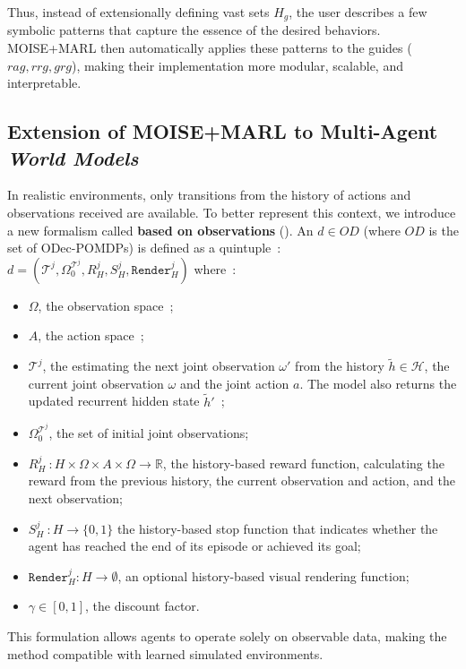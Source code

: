 {Thus, instead of extensionally defining vast sets \(H_g\), the user describes a few symbolic patterns that capture the essence of the desired behaviors. MOISE+MARL then automatically applies these patterns to the guides (\(rag, rrg, grg\)), making their implementation more modular, scalable, and interpretable.

\subsection{Extension of MOISE+MARL to Multi-Agent \textit{World Models}}\label{sec:wm_extension}

\noindent In realistic environments, only transitions from the history of actions and observations received are available. To better represent this context, we introduce a new formalism called \textbf{ based on observations} (). An  $d \in OD$ (where $OD$ is the set of ODec-POMDPs) is defined as a quintuple~:
%
$d = (\mathcal{T}^j, \Omega^{\mathcal{T}^j}_0, R^j_H, S^j_H, \texttt{Render}^j_H)$
%
where~:
\begin{itemize}
  \item $\Omega$, the observation space~;
  \item $A$, the action space~;
  \item $\mathcal{T}^j$, the  estimating the next joint observation $\omega'$ from the history $\tilde{h} \in \mathcal{H}$, the current joint observation $\omega$ and the joint action $a$. The model also returns the updated recurrent hidden state $\tilde{h}'$~;
  \item $\Omega^{\mathcal{T}^j}_0$, the set of initial joint observations;
  \item $R^j_H~: H \times \Omega \times A \times \Omega \rightarrow \mathbb{R}$, the history-based reward function, calculating the reward from the previous history, the current observation and action, and the next observation;
  \item $S^j_H~: H \rightarrow \{0,1\}$ the history-based stop function that indicates whether the agent has reached the end of its episode or achieved its goal;
  \item $\texttt{Render}^j_H : H \rightarrow \emptyset$, an optional history-based visual rendering function;
  \item $\gamma \in [0, 1]$, the discount factor.
\end{itemize}

\noindent This formulation allows  agents to operate solely on observable data, making the method compatible with learned simulated environments.

}

